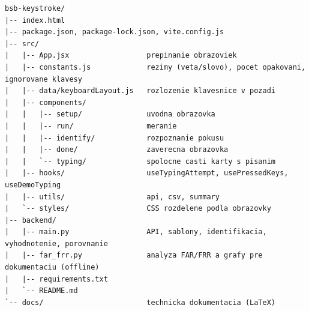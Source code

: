 \begin{lstlisting}
bsb-keystroke/
|-- index.html
|-- package.json, package-lock.json, vite.config.js
|-- src/
|   |-- App.jsx                  prepinanie obrazoviek
|   |-- constants.js             rezimy (veta/slovo), pocet opakovani, ignorovane klavesy
|   |-- data/keyboardLayout.js   rozlozenie klavesnice v pozadi
|   |-- components/
|   |   |-- setup/               uvodna obrazovka
|   |   |-- run/                 meranie
|   |   |-- identify/            rozpoznanie pokusu
|   |   |-- done/                zaverecna obrazovka
|   |   `-- typing/              spolocne casti karty s pisanim
|   |-- hooks/                   useTypingAttempt, usePressedKeys, useDemoTyping
|   |-- utils/                   api, csv, summary
|   `-- styles/                  CSS rozdelene podla obrazovky
|-- backend/
|   |-- main.py                  API, sablony, identifikacia, vyhodnotenie, porovnanie
|   |-- far_frr.py               analyza FAR/FRR a grafy pre dokumentaciu (offline)
|   |-- requirements.txt
|   `-- README.md
`-- docs/                        technicka dokumentacia (LaTeX)
\end{lstlisting}
